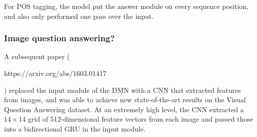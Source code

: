 For POS tagging, the model put the answer module on every sequence position, and also only performed one pass over the input.

\subsubsection{Image question answering?}
A subsequent paper (\begin{tt}https://arxiv.org/abs/1603.01417\end{tt}) replaced the input module of the DMN with a CNN that extracted features from images, and was able to achieve new state-of-the-art results on the Visual Question Answering dataset. At an extremely high level, the CNN extracted a $14\times 14$ grid of 512-dimensional feature vectors from each image and passed those into a bidirectional GRU in the input module.
